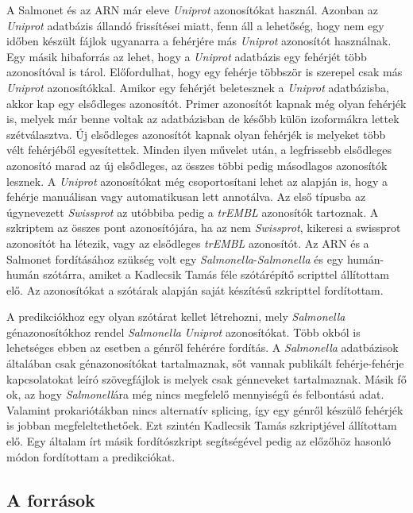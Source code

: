 \documentclass[a4paper,12pt]{article}
\begin{document}
			A Salmonet és az ARN már eleve \textit{Uniprot} azonosítókat használ. Azonban az \textit{Uniprot} adatbázis állandó frissítései miatt, fenn áll a lehetőség, hogy nem egy időben készült fájlok ugyanarra a fehérjére más \textit{Uniprot} azonosítót használnak. Egy másik hibaforrás az lehet, hogy a \textit{Uniprot} adatbázis egy fehérjét több azonosítóval is tárol. Előfordulhat, hogy egy fehérje többször is szerepel csak más \textit{Uniprot} azonosítókkal. Amikor egy fehérjét beletesznek a \textit{Uniprot} adatbázisba, akkor kap egy elsődleges azonosítót. Primer azonosítót kapnak még olyan fehérjék is, melyek már benne voltak az adatbázisban de később külön izoformákra lettek szétválasztva. Új elsődleges azonosítót kapnak olyan fehérjék is melyeket több vélt fehérjéből egyesítettek. Minden ilyen művelet után, a legfrissebb elsődleges azonosító marad az új elsődleges, az összes többi pedig másodlagos azonosítók lesznek. A \textit{Uniprot} azonosítókat még csoportosítani lehet az alapján is, hogy a fehérje manuálisan vagy automatikusan lett annotálva. Az első típusba az úgynevezett \textit{Swissprot} az utóbbiba pedig a \textit{trEMBL} azonosítók tartoznak. A szkriptem az összes pont azonosítójára, ha az nem \textit{Swissprot}, kikeresi a swissprot azonosítót ha létezik, vagy az elsődleges \textit{trEMBL} azonosítót. Az ARN és a Salmonet fordításához szükség volt egy \textit{Salmonella}-\textit{Salmonella} és egy humán-humán szótárra, amiket a Kadlecsik Tamás féle szótárépítő scripttel állítottam elő. Az azonosítókat a szótárak alapján saját készítésű szkripttel fordítottam.
			
			A predikciókhoz egy olyan szótárat kellet létrehozni, mely \textit{Salmonella} génazonosítókhoz rendel \textit{Salmonella} \textit{Uniprot} azonosítókat. Több okból is lehetséges ebben az esetben a génről fehérére fordítás. A \textit{Salmonella} adatbázisok általában csak génazonosítókat tartalmaznak, sőt vannak publikált fehérje-fehérje kapcsolatokat leíró szövegfájlok is melyek csak génneveket tartalmaznak. Másik fő ok, az hogy \textit{Salmonell}ára még nincs megfelelő mennyiségű és felbontású adat. Valamint prokariótákban nincs alternatív splicing, így egy génről készülő fehérjék is jobban megfeleltethetőek. Ezt szintén Kadlecsik Tamás szkriptjével állítottam elő. Egy általam írt másik fordítószkript segítségével pedig az előzőhöz hasonló módon fordítottam a predikciókat.
			
			
		\subsection{A források}
\end{document}
